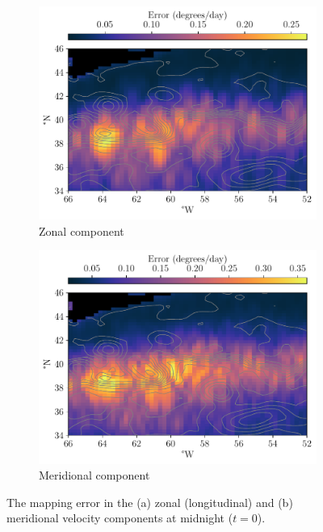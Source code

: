 \begin{figure}
	\centering
	\begin{subfigure}{0.49\textwidth}
		\includegraphics[width=\textwidth]{chp06_applications/figures/gulf_stream/u_err_0}
		\caption{Zonal component}
	\end{subfigure}
	\begin{subfigure}{0.49\textwidth}
		\includegraphics[width=\textwidth]{chp06_applications/figures/gulf_stream/v_err_0}
		\caption{Meridional component}
	\end{subfigure}
	\caption{The mapping error in the (a) zonal (longitudinal) and (b) meridional velocity components at midnight  (\(t = 0\)).}
	\label{fig:natl_err}
\end{figure}

